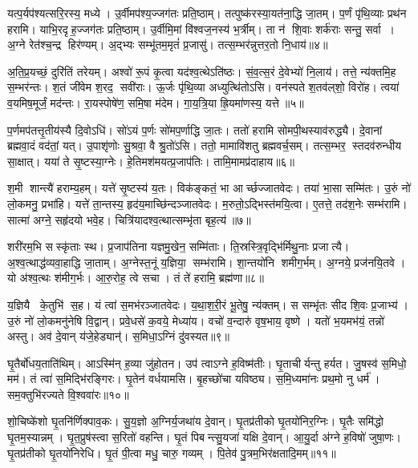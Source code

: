 यत्प॒र्यप॑श्यत्सरि॒रस्य॒ मध्ये। उ॒र्वीमप॑श्य॒ज्जग॑तः प्रति॒ष्ठाम्। तत्पुष्क॑रस्या॒यत॑ना॒द्धि जा॒तम्। प॒र्णं पृ॑थि॒व्याः प्रथ॑न हरामि। याभि॒रदृह॒ज्जग॑तः प्रति॒ष्ठाम्। उ॒र्वीमि॒मां वि॑श्वज॒नस्य॑ भ॒र्त्रीम्। ता न॑ शि॒वाः शर्क॑राः सन्तु॒ सर्वा। अ॒ग्ने रेत॑श्च॒न्द्र हिर॑ण्यम्। अ॒द्भ्यः सम्भू॑तम॒मृतं॑ प्र॒जासु॑। तत्स॒म्भर॑न्नुत्तर॒तो नि॒धाय॑॥४॥

अ॒ति॒प्र॒यच्छं॒ दुरि॑तिं तरेयम्। अश्वो॑ रू॒पं कृ॒त्वा यद॑श्व॒त्थेऽति॑ष्ठः। सं॒व॒त्स॒रं दे॒वेभ्यो॑ नि॒लाय॑। तत्ते॒ न्य॑क्तमि॒ह स॒म्भर॑न्तः। श॒तं जी॑वेम श॒रद॒ सवी॑राः। ऊ॒र्जः पृ॑थि॒व्या अध्युत्थि॑तोऽसि। वन॑स्पते श॒तव॑ल्‌शो॒ विरो॑ह। त्वया॑ व॒यमिष॒मूर्जं॒ मद॑न्तः। रा॒यस्पोषे॑ण॒ समि॒षा म॑देम। गा॒य॒त्रि॒या ह्रि॒यमा॑णस्य॒ यत्ते॥५॥

प॒र्णमप॑तत्तृ॒तीय॑स्यै दि॒वोऽधि॑। सो॑ऽयं प॒र्णः सो॑मप॒र्णाद्धि जा॒तः। ततो॑ हरामि सोमपी॒थस्याव॑रुद्ध्यै। दे॒वानां ब्रह्मवा॒दं वद॑तां॒ यत्। उ॒पाशृ॑णोः सु॒श्रवा॒ वै श्रु॒तो॑ऽसि। ततो॒ मामावि॑शतु ब्रह्मवर्च॒सम्। तत्स॒म्भर॒ स्तदव॑रुन्धीय सा॒क्षात्। यया॑ ते सृ॒ष्टस्या॒ग्नेः। हे॒तिमश॑मयत्प्र॒जाप॑तिः। तामि॒मामप्र॑दाहाय॥६॥

श॒मी शान्त्यै॑ हराम्य॒हम्। यत्ते॑ सृ॒ष्टस्य॑ य॒तः। विक॑ङ्कतं॒ भा आर्च्छज्जातवेदः। तया॑ भा॒सा सम्मि॑तः। उ॒रुं नो॑ लो॒कमनु॒ प्रभा॑हि। यत्ते॑ ता॒न्तस्य॒ हृद॑य॒माच्छि॑न्दञ्जातवेदः। म॒रुतो॒ऽद्भिस्त॑मयि॒त्वा। ए॒तत्ते॒ तद॑श॒नेः सम्भ॑रामि। सात्मा॑ अग्ने॒ सहृ॑दयो भवे॒ह। चित्रि॑यादश्व॒त्थात्सम्भृ॑ता बृह॒त्य॑॥७॥

शरी॑रम॒भि सस्कृ॑ताः स्थ। प्र॒जाप॑तिना यज्ञमु॒खेन॒ सम्मि॑ताः। ति॒स्रस्त्रि॒वृद्भि॑र्मिथु॒नाः प्रजात्यै। अ॒श्व॒त्थाद्ध॑व्य\-वा॒हाद्धि जा॒ताम्। अ॒ग्नेस्त॒नूं य॒ज्ञिया॒ सम्भ॑रामि। शा॒न्तयो॑नि शमीग॒र्भम्। अ॒ग्नये॒ प्रज॑नयि॒तवे। यो अ॑श्व॒त्थः श॑मीग॒र्भः। आ॒रु॒रोह॒ त्वे सचा। तं ते॑ हरामि॒ ब्रह्म॑णा॥८॥

य॒ज्ञियै के॒तुभि॑ स॒ह। यं त्वा॑ स॒मभ॑रञ्जातवेदः। य॒था॒श॒री॒रं भू॒तेषु॒ न्य॑क्तम्। स सम्भृ॑तः सीद शि॒वः प्र॒जाभ्य॑। उ॒रुं नो॑ लो॒कमनु॑नेषि वि॒द्वान्। प्रवे॒धसे॑ क॒वये॒ मेध्या॑य। वचो॑ व॒न्दारु॑ वृष॒भाय॒ वृष्णे। यतो॑ भ॒यमभ॑यं॒ तन्नो॑ अस्तु। अव॑ दे॒वान् य॑जे॒हेड्यान्॑। स॒मिधा॒ऽग्निं दु॑वस्यत॥९॥

घृ॒तैर्बो॑धय॒ताति॑थिम्। आऽस्मि॑न् ह॒व्या जु॑होतन। उप॑ त्वाऽग्ने ह॒विष्म॑तीः। घृ॒ताचीर्यन्तु हर्यत। जु॒षस्व॑ स॒मिधो॒ मम॑। तं त्वा॑ स॒मिद्भि॑रङ्गिरः। घृ॒तेन॑ वर्धयामसि। बृ॒हच्छो॑चा यविष्ठ्य। स॒मि॒ध्यमा॑नः प्रथ॒मो नु धर्म॑। सम॒क्तुभि॑रज्यते वि॒श्ववा॑रः॥१०॥

शो॒चिष्के॑शो घृ॒तनि॑र्णिक्पाव॒कः। सु॒य॒ज्ञो अ॒ग्निर्य॒जथा॑य दे॒वान्। घृ॒तप्र॑तीको घृ॒तयो॑निर॒ग्निः। घृ॒तैः समि॑द्धो घृ॒तम॒स्यान्नम्। घृ॒त॒प्रुष॑स्त्वा स॒रितो॑ वहन्ति। घृ॒तं पिबन्त्सु॒यजा॑ यक्षि दे॒वान्। आ॒यु॒र्दा अ॑ग्ने ह॒विषो॑ जुषा॒णः। घृ॒तप्र॑तीको घृ॒तयो॑निरेधि। घृ॒तं पी॒त्वा मधु॒ चारु॒ गव्यम्। पि॒तेव॑ पु॒त्रम॒भिर॑क्षतादि॒मम्॥११॥

